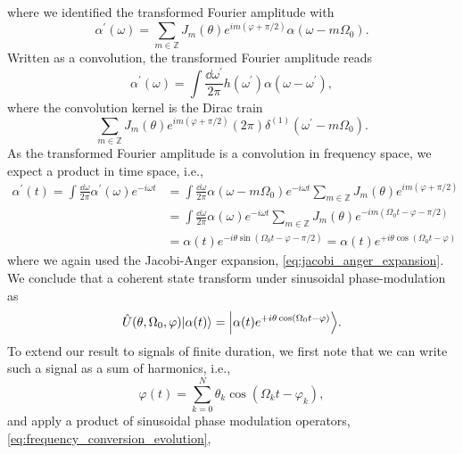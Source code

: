 where we identified the transformed Fourier amplitude with
\begin{equation}
	\alpha^\prime(\omega)
	=
	\sum_{m\in\mathbb{Z}}
	J_m(\theta)
	e^{im(\varphi+\pi/2)}
	\alpha(\omega-m\Omega_0)
	\label{eq:frequency_conversion_frequency_amplitude}
	.
\end{equation}
Written as a convolution, the transformed Fourier amplitude reads
\begin{equation}
	\alpha^\prime(\omega)
	=
	\int\frac{\dd{\omega^\prime}}{2\pi}
	h(\omega^\prime)
	\alpha(\omega-\omega^\prime)
	,
\end{equation}
where the convolution kernel is the Dirac train
\begin{equation}
	\sum_{m\in\mathbb{Z}}
	J_m(\theta)
	e^{im(\varphi+\pi/2)}
	(2\pi)
	\delta^{(1)}(\omega^\prime-m\Omega_0)
	\label{eq:phase_modulation_sinusoidal_kernel}
	.
\end{equation}
As the transformed Fourier amplitude is a convolution in frequency space, we expect a product in time space, i.e.,
\begin{equation}
	\begin{split}
		\alpha^\prime(t)
		=
		\int\frac{\dd{\omega}}{2\pi}
		\alpha^\prime(\omega)
		e^{-i\omega t}
		&=
		\int\frac{\dd{\omega}}{2\pi}
		\alpha(\omega-m\Omega_0)
		e^{-i\omega t}
		\sum_{m\in\mathbb{Z}}
		J_m(\theta)
		e^{im(\varphi+\pi/2)}
		\\
		&=
		\int\frac{\dd{\omega}}{2\pi}
		\alpha(\omega)
		e^{-i\omega t}
		\sum_{m\in\mathbb{Z}}
		J_m(\theta)
		e^{-im(\Omega_0t-\varphi-\pi/2)}
		\\
		&=
		\alpha(t)
		e^{-i\theta\sin(\Omega_0t-\varphi-\pi/2)}
		=
		\alpha(t)
		e^{+i\theta\cos(\Omega_0t-\varphi)}
	\end{split}
\end{equation}
where we again used the Jacobi-Anger expansion, \cref{eq:jacobi_anger_expansion}.
We conclude that a coherent state transform under sinusoidal phase-modulation as
\begin{equation}
	\hat{U}(\theta,\Omega_0,\varphi)
	\ket*{\alpha(t)}
	=
	\ket*{\alpha(t)e^{+i\theta\cos(\Omega_0t-\varphi)}}
	.
\end{equation}
To extend our result to signals of finite duration, we first note that we can write such a signal as a sum of harmonics, i.e.,
\begin{equation}
	\varphi(t)
	=
	\sum_{k=0}^N
	\theta_k
	\cos(\Omega_kt-\varphi_k)
	,
\end{equation}
and apply a product of sinusoidal phase modulation operators, \cref{eq:frequency_conversion_evolution},
